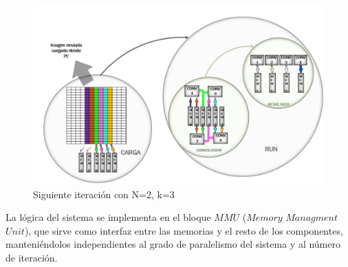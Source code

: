 \begin{figure}
\centering
\includegraphics[scale=0.7]{example_2}
\caption{Siguiente iteración con N=2, k=3}
\label{writingprocess4}
\end{figure}




La lógica del sistema se implementa en el bloque $MMU$ ($Memory$ $Managment$ $Unit$), que sirve como interfaz entre las memorias y el resto de los componentes, 
manteniéndolos independientes al grado de paralelismo del sistema y al número de iteración.

\bigskip

\clearpage
\newpage
